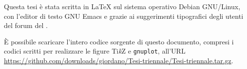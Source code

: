 \thispagestyle{empty}
\hfill
\vfill
Questa tesi è stata scritta in \LaTeX{} sul sistema operativo Debian GNU/Linux,
con l'editor di testo GNU Emacs e grazie ai suggerimenti tipografici degli
utenti del forum del \GuIT.

È possibile scaricare l'intero codice sorgente di questo documento, compresi i
codici scritti per realizzare le figure Ti\emph{k}Z e \texttt{gnuplot}, all'URL
\url{https://github.com/downloads/giordano/Tesi-triennale/Tesi-triennale.tar.gz}.

